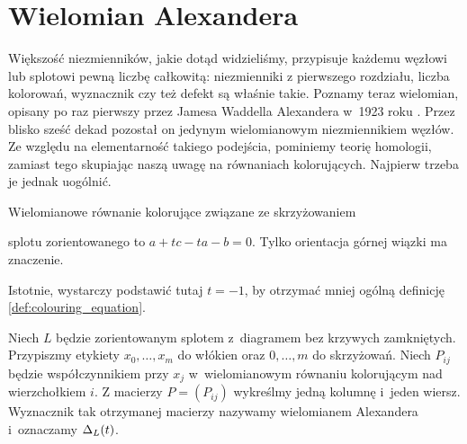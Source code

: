 \section{Wielomian Alexandera}
Większość niezmienników, jakie dotąd widzieliśmy, przypisuje każdemu węzłowi lub splotowi pewną liczbę całkowitą: niezmienniki z pierwszego rozdziału, liczba kolorowań, wyznacznik czy też defekt są właśnie takie.
Poznamy teraz wielomian, opisany po raz pierwszy przez Jamesa Waddella Alexandera w~1923 roku \cite{alexander23}.
Przez blisko sześć dekad pozostał on jedynym wielomianowym niezmiennikiem węzłów.
Ze względu na elementarność takiego podejścia, pominiemy teorię homologii, zamiast tego skupiając naszą uwagę na równaniach kolorujących.
Najpierw trzeba je jednak uogólnić.

\begin{definition}
    Wielomianowe równanie kolorujące związane ze skrzyżowaniem
\begin{comment}
    \[\begin{tikzpicture}[baseline=-0.65ex, scale=0.12]
    \useasboundingbox (-5, -5) rectangle (5,5);
    \begin{knot}[clip width=5, end tolerance=1pt, flip crossing/.list={1}]
        \strand[semithick] (-5,5) to (5,-5);
        \strand[semithick,-Latex] (-5,-5) to (5,5);
        \node[darkblue] at (5, 5)[below right] {$a$};
        \node[darkblue] at (5, -5)[above right] {$b$};
        \node[darkblue] at (-5, 5)[below left] {$c$};
    \end{knot}
    \end{tikzpicture}\]
\end{comment}
    splotu zorientowanego to $a + tc - ta - b = 0$.
    Tylko orientacja górnej wiązki ma znaczenie.
\end{definition}

Istotnie, wystarczy podstawić tutaj $t = -1$, by otrzymać mniej ogólną definicję \ref{def:colouring_equation}.

\begin{definition}
    \label{def:alexander_polynomial}
    Niech $L$ będzie zorientowanym splotem z~diagramem bez krzywych zamkniętych.
    Przypiszmy etykiety $x_0, \ldots, x_m$ do włókien oraz $0, \ldots, m$ do skrzyżowań.
    Niech $P_{ij}$ będzie współczynnikiem przy $x_j$ w~wielomianowym równaniu kolorującym nad wierzchołkiem $i$.
    Z macierzy $P=(P_{ij})$ wykreślmy jedną kolumnę i~jeden wiersz.
    Wyznacznik tak otrzymanej macierzy nazywamy wielomianem Alexandera i~oznaczamy $\Delta_L(t)$.
\end{definition}

